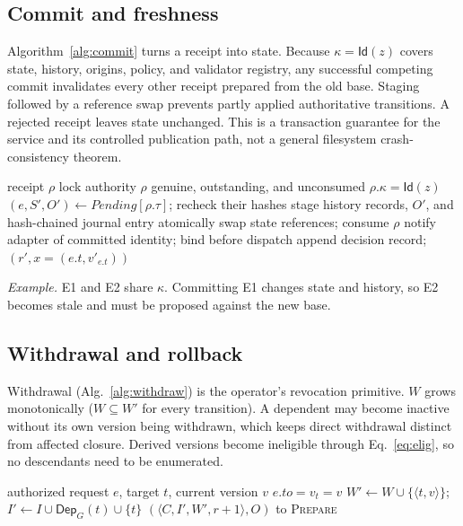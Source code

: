 \documentclass[letterpaper,journal]{IEEEtran}
\newcommand{\vid}[2]{\ensuremath{\langle #1,#2\rangle}}
\DeclareRobustCommand{\circled}[1]{\expandafter\usebox\csname flowbadge#1\endcsname}
\begin{document}
\subsection{Commit and freshness}
Algorithm~\ref{alg:commit} turns a receipt into state. Because $\kappa=\mathsf{Id}(z)$ covers state, history, origins, policy, and validator registry, any successful competing commit invalidates every other receipt prepared from the old base. Staging followed by a reference swap prevents partly applied authoritative transitions. A rejected receipt leaves state unchanged. This is a transaction guarantee for the service and its controlled publication path, not a general filesystem crash-consistency theorem.

\begin{algorithm}[t]\caption{\textsc{Commit}: apply a receipt (flows \circled{3} and \circled{4})}\label{alg:commit}\footnotesize
\begin{algorithmic}[1]
\Require receipt $\rho$
\State lock authority
\State \Req $\rho$ genuine, outstanding, and unconsumed
\State \Req $\rho.\kappa=\mathsf{Id}(z)$ 
\State $(e,S',O')\gets\mathit{Pending}[\rho.\tau]$; recheck their hashes
\State stage history records, $O'$, and hash-chained journal entry
\State atomically swap state references; consume $\rho$
\State notify adapter of committed identity; bind before dispatch
\State append decision record; \Return $(r',x=(e.t,v'_{e.t}))$
\end{algorithmic}\end{algorithm}

\textit{Example.} E1 and E2 share $\kappa$. Committing E1 changes state and history, so E2 becomes stale and must be proposed against the new base.

\subsection{Withdrawal and rollback}
Withdrawal (Alg.~\ref{alg:withdraw}) is the operator's revocation primitive. $W$ grows monotonically ($W\subseteq W'$ for every transition). A dependent may become inactive without its own version being withdrawn, which keeps direct withdrawal distinct from affected closure. Derived versions become ineligible through Eq.~\eqref{eq:elig}, so no descendants need to be enumerated.

\begin{algorithm}[t]\caption{\textsc{Withdraw}: construct a candidate}\label{alg:withdraw}\footnotesize
\begin{algorithmic}[1]
\Require authorized request $e$, target $t$, current version $v$
\State \Req $e.\mathit{to}=v_t=v$ 
\State $W'\gets W\cup\{\vid{t}{v}\}$; $I'\gets I\cup\mathsf{Dep}_{G}(t)\cup\{t\}$
\State \Return $(\langle C,I',W',r{+}1\rangle,O)$ to \textsc{Prepare}
\end{algorithmic}\end{algorithm}
\end{document}
